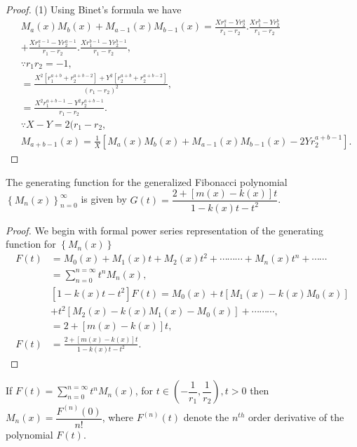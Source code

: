 \begin{proof} (1)
Using Binet's formula we have
\begin{align*} 
&M_{a}(x)M_{b}(x)+M_{a-1}(x)M_{b-1}(x)=\frac{Xr_{1}^a-Yr_{2}^a}{r_{1}-r_{2}}.\frac{Xr_{1}^b-Yr_{2}^b}{r_{1}-r_{2}}\\&+\frac{Xr_{1}^{a-1}-Yr_{2}^{a-1}}{r_{1}-r_{2}}.\frac{Xr_{1}^{b-1}-Yr_{2}^{b-1}}{r_{1}-r_{2}},\\
&\because r_{1}r_{2}=-1,\\
&=\frac{X^2[r_{1}^{a+b}+r_{2}^{a+b-2}]+Y^2[r_{2}^{a+b}+r_{2}^{a+b-2}]}{(r_{1}-r_{2})^2},\\
&=\frac{X^2r_{1}^{a+b-1}-Y^2r_{2}^{a+b-1}}{r_{1}-r_{2}}.\\
&\because X-Y=2(r_{1}-r_{2},\\
&M_{a+b-1}(x)= \frac{1}{X}{[M_{a}(x)M_{b}(x)+M_{a-1}(x)M_{b-1}(x)-2Yr_{2}^{a+b-1}]}.
\end{align*}
\end{proof}
\begin{theorem}
The generating function for the generalized Fibonacci  polynomial $\left\{M_{n}(x)\right\}_{n=0}^{\infty}$ is given by $G(t)=\dfrac{2+\left[m(x)-k(x)\right]t}{1-k(x)t-t^2}$.
\end{theorem}
\begin{proof}
We begin with formal power series representation of the generating function for $\left\{M_{n}(x)\right\}$
\begin{align*}
F(t)&=M_{0}(x)+M_{1}(x)t+M_{2}(x)t^2+\cdots\cdots\cdots+M_{n}(x)t^n+\cdots\cdots\\
&=\sum_{n=0}^{n=\infty}t^n M_{n}(x),\\
&[1-k(x)t-t^2]F(t)=M_{0}(x)+t[M_{1}(x)-k(x)M_{0}(x)]\\&+t^2[M_{2}(x)-k(x)M_{1}(x)-M_{0}(x)]+\cdots\cdots\cdots,\\
&=2+[m(x)-k(x)]t,\\
F(t)&=\frac{2+\left[m(x)-k(x)\right]t}{1-k(x)t-t^2}.
\end{align*}
\end{proof}
\begin{theorem}
If $F(t)=\sum_{n=0}^{n=\infty}t^n M_{n}(x)$, for $t\in(-\dfrac{1}{r_{1}},\dfrac{1}{r_{2}}),t>0$ then $M_{n}(x)=\dfrac{F^{(n)}(0)}{n!}$, where $F^{(n)}(t)$ denote the $n^{th}$ order derivative of the polynomial $F(t)$.
\end{theorem}
